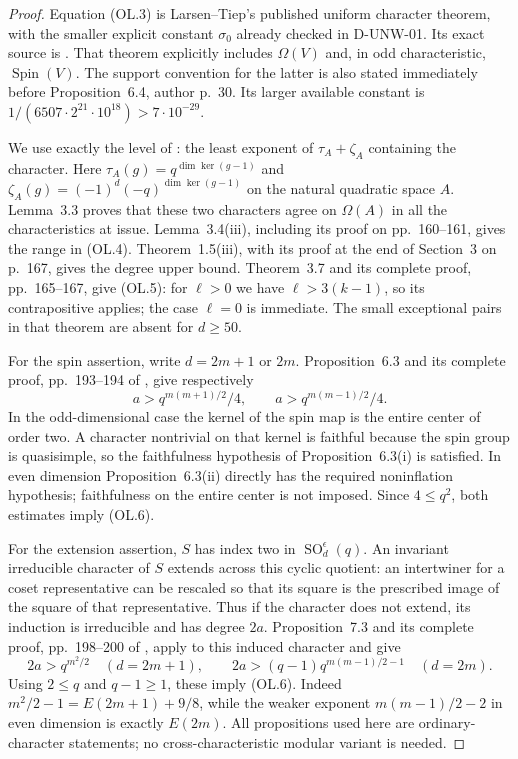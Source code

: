 \begin{proof}
Equation (OL.3) is Larsen--Tiep's published uniform character
theorem, with the smaller explicit constant $\sigma_0$ already
checked in D-UNW-01. Its exact source is
\cite[Theorem~5.5 and complete proof, accepted-author pp.~25--26]
{UNW:LT2024}. That theorem explicitly includes $\Omega(V)$ and,
in odd characteristic, $\operatorname{Spin}(V)$. The support
convention for the latter is also stated immediately before
Proposition~6.4, author p.~30. Its larger available constant is
$1/(6507\cdot2^{21}\cdot10^{18})>7\cdot10^{-29}$.

We use exactly the level of
\cite[Definition~3.2(ii), p.~160]{OL:GLT2024}: the least exponent
of $\tau_A+\zeta_A$ containing the character. Here
$\tau_A(g)=q^{\dim\ker(g-1)}$ and
$\zeta_A(g)=(-1)^d(-q)^{\dim\ker(g-1)}$ on the natural
quadratic space $A$. Lemma~3.3 proves that these two characters
agree on $\Omega(A)$ in all the characteristics at issue.
Lemma~3.4(iii), including its proof on pp.~160--161, gives the
range in (OL.4). Theorem~1.5(iii), with its proof at the end of
Section~3 on p.~167, gives the degree upper bound.
Theorem~3.7 and its complete proof, pp.~165--167, give (OL.5):
for $\ell>0$ we have $\ell>3(k-1)$, so its contrapositive applies;
the case $\ell=0$ is immediate. The small
exceptional pairs in that theorem are absent for $d\ge50$.

For the spin assertion, write $d=2m+1$ or $2m$.
Proposition~6.3 and its complete proof, pp.~193--194 of
\cite{OL:GLT2024}, give respectively
\[
 a>q^{m(m+1)/2}/4,\qquad a>q^{m(m-1)/2}/4.
                                                               \tag{OL.7}
\]
In the odd-dimensional case the kernel of the spin map is the
entire center of order two. A character nontrivial on that
kernel is faithful because the spin group is quasisimple, so
the faithfulness hypothesis of Proposition~6.3(i) is satisfied.
In even dimension Proposition~6.3(ii) directly has the required
noninflation hypothesis; faithfulness on the entire center is
not imposed. Since $4\le q^2$, both estimates imply (OL.6).

For the extension assertion, $S$ has index two in
$\operatorname{SO}_d^\epsilon(q)$. An invariant irreducible
character of $S$ extends across this cyclic quotient: an
intertwiner for a coset representative can be rescaled so that
its square is the prescribed image of the square of that
representative. Thus if the character does not extend, its
induction is irreducible and has degree $2a$.
Proposition~7.3 and its complete proof, pp.~198--200 of
\cite{OL:GLT2024}, apply to this induced character and give
\[
 2a>q^{m^2/2}\quad(d=2m+1),\qquad
 2a>(q-1)q^{m(m-1)/2-1}\quad(d=2m).
                                                               \tag{OL.8}
\]
Using $2\le q$ and $q-1\ge1$, these imply (OL.6).
Indeed $m^2/2-1=E(2m+1)+9/8$, while the weaker exponent
$m(m-1)/2-2$ in even dimension is exactly $E(2m)$.
All propositions used here are ordinary-character statements;
no cross-characteristic modular variant is needed.
\end{proof}

